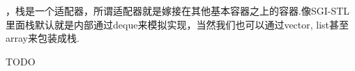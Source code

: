    
，栈是一个适配器，所谓适配器就是嫁接在其他基本容器之上的容器.像SGI-STL里面栈默认就是内部通过deque来模拟实现，当然我们也可以通过vector, list甚至array来包装成栈.

\qquad TODO
